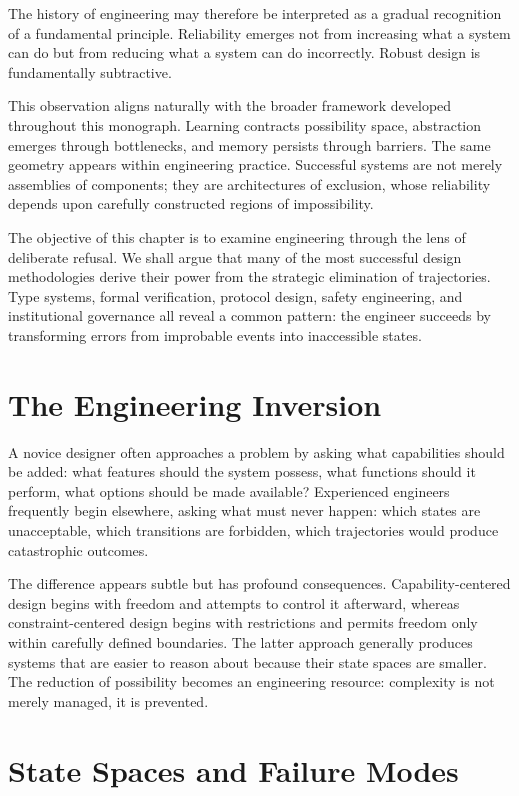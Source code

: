 \documentclass[11pt,oneside]{book}
\theoremstyle{plain}
\theoremstyle{definition}
\theoremstyle{remark}
\begin{document}
The history of engineering may therefore be interpreted as a gradual recognition of a fundamental principle. Reliability emerges not from increasing what a system can do but from reducing what a system can do incorrectly. Robust design is fundamentally subtractive.

This observation aligns naturally with the broader framework developed throughout this monograph. Learning contracts possibility space, abstraction emerges through bottlenecks, and memory persists through barriers. The same geometry appears within engineering practice. Successful systems are not merely assemblies of components; they are architectures of exclusion, whose reliability depends upon carefully constructed regions of impossibility.

The objective of this chapter is to examine engineering through the lens of deliberate refusal. We shall argue that many of the most successful design methodologies derive their power from the strategic elimination of trajectories. Type systems, formal verification, protocol design, safety engineering, and institutional governance all reveal a common pattern: the engineer succeeds by transforming errors from improbable events into inaccessible states.

\section{The Engineering Inversion}

A novice designer often approaches a problem by asking what capabilities should be added: what features should the system possess, what functions should it perform, what options should be made available? Experienced engineers frequently begin elsewhere, asking what must never happen: which states are unacceptable, which transitions are forbidden, which trajectories would produce catastrophic outcomes.

The difference appears subtle but has profound consequences. Capability-centered design begins with freedom and attempts to control it afterward, whereas constraint-centered design begins with restrictions and permits freedom only within carefully defined boundaries. The latter approach generally produces systems that are easier to reason about because their state spaces are smaller. The reduction of possibility becomes an engineering resource: complexity is not merely managed, it is prevented.

\section{State Spaces and Failure Modes}
\end{document}
